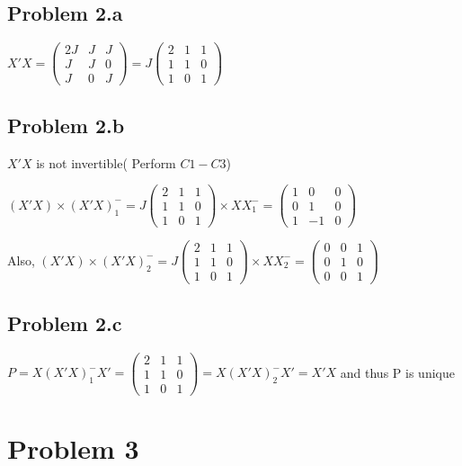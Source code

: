 \documentclass[a4paper]{article}
\begin{document}
\subsection*{Problem 2.a}

$X'X = \begin{pmatrix}2J & J  & J \\ J & J & 0 \\ J & 0 & J  \end{pmatrix} = J \begin{pmatrix} 2 & 1 &1\\ 1 & 1 & 0 \\ 1 & 0 & 1 \end{pmatrix}$

\subsection*{Problem 2.b}
$X'X$ is not invertible( Perform $C1-C3$)

$(X'X) \times (X'X)_1^{-} =J \begin{pmatrix} 2 & 1 &1\\ 1 & 1 & 0 \\ 1 & 0 & 1 \end{pmatrix} \times XX_1^- = \begin{pmatrix}1 & 0 & 0\\ 0 & 1 & 0\\ 1& -1 & 0 \end{pmatrix}$ 

Also, $(X'X) \times (X'X)_2^{-} =J \begin{pmatrix} 2 & 1 &1\\ 1 & 1 & 0 \\ 1 & 0 & 1 \end{pmatrix} \times XX_2^- = \begin{pmatrix} 0 & 0 & 1\\ 0 & 1 & 0\\ 0 & 0 & 1 \end{pmatrix}$ 
\subsection*{Problem 2.c}

$P = X(X'X)_1^-X' = \begin{pmatrix}2 & 1 & 1\\ 1 & 1 & 0\\ 1 & 0 & 1 \end{pmatrix}=X(X'X)_2^-X'= X'X$
and thus P is unique

\section*{Problem 3}
\end{document}
